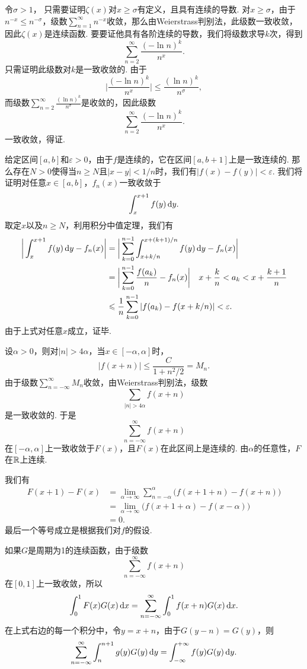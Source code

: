\begin{ans}
  令$\sigma>1$， 只需要证明$\zeta(x)$对$x\ge\sigma$有定义，且具有连续的导数. 对$x\ge \sigma$，由于$n^{-x}\le n^{-\sigma}$，级数$\sum_{n=1}^\infty n^{-x}$收敛，那么由Weierstrass判别法，此级数一致收敛，因此$\zeta(x)$是连续函数. 要要证他具有各阶连续的导数，我们将级数求导$k$次，得到
  \[
    \sum_{n=2}^\infty\frac{(-\ln n)^k}{n^x}.
  \]
  只需证明此级数对$k$是一致收敛的. 由于
  \[
    \bigg| \frac{(-\ln n)^k}{n^x} \bigg|
    \le \frac{(\ln n)^k}{n^\sigma},
  \]
  而级数$\sum_{n=2}^\infty\frac{(\ln n)^k}{n^\sigma}$是收敛的，因此级数
  \[
    \sum_{n=2}^\infty\frac{(-\ln n)^k}{n^x}.
  \]
  一致收敛，得证.
\end{ans}

\begin{ans}
  给定区间$[a,b]$和$\varepsilon>0$，由于$f$是连续的，它在区间$[a,b+1]$上是一致连续的. 那么存在$N>0$使得当$n\ge N$且$|x-y|<1/n$时，我们有$|f(x)-f(y)|<\varepsilon$. 我们将证明对任意$x\in[a,b]$，$f_n(x)$一致收敛于
  \[
    \int_x^{x+1}f(y)\,\mathrm dy.
  \]
  取定$x$以及$n\ge N$，利用积分中值定理，我们有
  \begin{align*}
    \bigg|
      \int_x^{x+1}f(y)\,\mathrm dy - f_n(x)
    \bigg| & = \bigg|
      \sum_{k=0}^{n-1}\int_{x+k/n}^{x+(k+1)/n}
      f(y)\,\mathrm dy - f_n(x)
    \bigg| \\
    & = \bigg|
      \sum_{k=0}^{n-1} \frac{f(a_k)}n - f_n(x)
    \bigg|\quad x+\frac kn <a_k<x+\frac{k+1}n \\
    & \leqslant \frac1n\sum_{k=0}^{n-1}
    |f(a_k) - f(x+k/n)| < \varepsilon.
  \end{align*}
  由于上式对任意$x$成立，证毕.
\end{ans}

\begin{ans}
  设$\alpha>0$，则对$|n|>4\alpha$，当$x\in[-\alpha,\alpha]$时，
  \[
    |f(x+n)| \le \frac C{1+n^2/2} = M_n.
  \]
  由于级数$\sum_{n=-\infty}^{\infty}M_n$收敛，由Weierstrass判别法，级数
  \[ \sum_{|n|>4\alpha}f(x+n) \]
  是一致收敛的. 于是
  \[ \sum_{n=-\infty}^\infty f(x+n) \]
  在$[-\alpha,\alpha]$上一致收敛于$F(x)$，且$F(x)$在此区间上是连续的. 由$\alpha$的任意性，$F$在$\mathbb R$上连续.

  我们有
  \begin{align*}
    F(x+1)-F(x) & = \lim_{\alpha\to\infty}
    \sum_{n=-\alpha}^\alpha\big( f(x+1+n)-f(x+n) \big)\\
    & = \lim_{\alpha\to\infty}\big(f(x+1+\alpha)
    -f(x-\alpha)\big)\\
    & = 0 .
  \end{align*}
  最后一个等号成立是根据我们对$f$的假设.

  如果$G$是周期为1的连续函数，由于级数
  \[ \sum_{n=-\infty}^\infty f(x+n) \]
  在$[0,1]$上一致收敛，所以
  \[
    \int_0^1F(x)G(x)\,\mathrm dx = \sum_{n=-\infty}^\infty
     \int_0^1f(x+n)G(x)\,\mathrm dx.
  \]
  在上式右边的每一个积分中，令$y=x+n$，由于$G(y-n)=G(y)$，则
  \[
    \sum_{n=-\infty}^\infty\int_n^{n+1}g(y)G(y)\,\mathrm dy
    =\int_{-\infty}^{+\infty}f(y)G(y)\,\mathrm dy.
  \]
\end{ans}


